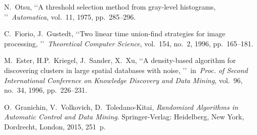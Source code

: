 \documentclass[conference,a4paper,twocolumn]{IEEEtran}
\begin{document}
\begin{thebibliography}{99}
 N.~Otsu, \lq\lq A threshold selection method from gray-level histograms, \rq\rq~\emph{Automatica}, vol.~11, 1975, pp.~285--296.

 C.~Fiorio, J.~Gustedt, \lq\lq Two linear time union-find strategies for image processing, \rq\rq~\emph{Theoretical Computer Science}, vol.~154, no.~2, 1996, pp.~165--181.

 M.~Ester, H.P.~Kriegel, J.~Sander, X.~Xu, \lq\lq A density-based algorithm for discovering clusters in large spatial databases with noise, \rq\rq~in~\emph{Proc. of Second International
Conference on Knowledge Discovery and Data Mining}, vol.~96, no.~34, 1996, pp.~226--231.

 O.~Granichin, V.~Volkovich, D.~Toledano-Kitai, \emph{Randomized Algorithms in Automatic Control and Data Mining}. Springer-Verlag: Heidelberg, New York, Dordrecht, London, 2015, 251~p.

\end{thebibliography}


\end{document}

